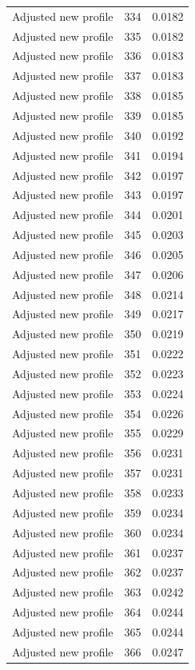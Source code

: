 \begin{table}[htbp]
\begin{tabular}{lll}
Adjusted new profile & 334 & 0.0182 \\
Adjusted new profile & 335 & 0.0182 \\
Adjusted new profile & 336 & 0.0183 \\
Adjusted new profile & 337 & 0.0183 \\
Adjusted new profile & 338 & 0.0185 \\
Adjusted new profile & 339 & 0.0185 \\
Adjusted new profile & 340 & 0.0192 \\
Adjusted new profile & 341 & 0.0194 \\
Adjusted new profile & 342 & 0.0197 \\
Adjusted new profile & 343 & 0.0197 \\
Adjusted new profile & 344 & 0.0201 \\
Adjusted new profile & 345 & 0.0203 \\
Adjusted new profile & 346 & 0.0205 \\
Adjusted new profile & 347 & 0.0206 \\
Adjusted new profile & 348 & 0.0214 \\
Adjusted new profile & 349 & 0.0217 \\
Adjusted new profile & 350 & 0.0219 \\
Adjusted new profile & 351 & 0.0222 \\
Adjusted new profile & 352 & 0.0223 \\
Adjusted new profile & 353 & 0.0224 \\
Adjusted new profile & 354 & 0.0226 \\
Adjusted new profile & 355 & 0.0229 \\
Adjusted new profile & 356 & 0.0231 \\
Adjusted new profile & 357 & 0.0231 \\
Adjusted new profile & 358 & 0.0233 \\
Adjusted new profile & 359 & 0.0234 \\
Adjusted new profile & 360 & 0.0234 \\
Adjusted new profile & 361 & 0.0237 \\
Adjusted new profile & 362 & 0.0237 \\
Adjusted new profile & 363 & 0.0242 \\
Adjusted new profile & 364 & 0.0244 \\
Adjusted new profile & 365 & 0.0244 \\
Adjusted new profile & 366 & 0.0247 \\

\end{tabular}
\end{table}
